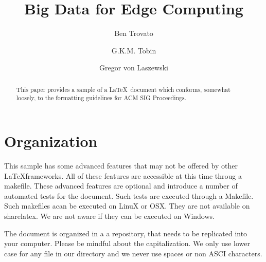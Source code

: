 




\title{Big Data for Edge Computing}


\author{Ben Trovato}

\author{G.K.M. Tobin}

\author{Gregor von Laszewski}


\renewcommand{\shortauthors}{G. v. Laszewski}


\begin{abstract}
This paper provides a sample of a \LaTeX\ document which conforms,
somewhat loosely, to the formatting guidelines for
ACM SIG Proceedings.
\end{abstract}



\maketitle


\section{Organization}

This sample has some advanced features that may not be offered by
other \LaTeX frameworks. All of these features are accessible at this
time throug a makefile. These advanced features are optional and
introduce a number of automated tests for the document. Such tests are
executed through a Makefile. Such makefiles acan be executed on LinuX
or OSX. They are not available on sharelatex. We are not aware if they
can be executed on Windows.

The document is organized in a a repository, that needs to be
replicated into your computer. Please be mindful about the
capitalization. We only use lower case for any file in our directory
and we never use spaces or non ASCI characters.

